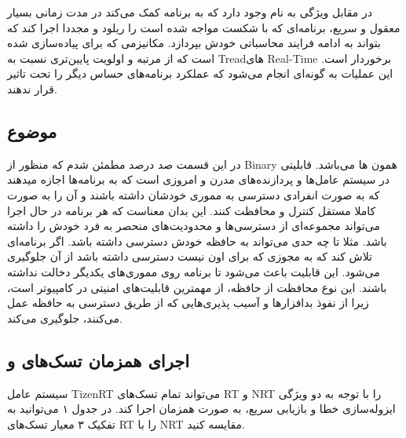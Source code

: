 \documentclass[10pt, a4paper]{article}
\begin{document}
در مقابل ویژگی به نام  وجود دارد که به برنامه کمک می‌کند در
مدت زمانی بسیار معقول و سریع، برنامه‌ای که با شکست مواجه شده‌ است را ریلود و
مجددا اجرا کند که بتواند به ادامه فرایند محاسباتی خودش بپردازد. مکانیزمی که برای
 پیاده‌سازی شده است که از مرتبه و اولویت پایین‌تری نسبت به
Treadهای Real-Time برخوردار است. این عملیات به گونه‌ای انجام می‌شود که عملکرد
برنامه‌های حساس دیگر  را تحت تاثیر قرار ندهند.

\subsection{موضوع }

در این قسمت صد درصد مطمئن شدم که منظور از Binary همون ها
می‌باشد. قابلیتی در سیستم عامل‌ها و پردازنده‌های مدرن و امروزی است که به
برنامه‌ها اجازه میدهند که به صورت انفرادی دسترسی به مموری خودشان داشته باشند و
آن را به صورت کاملا مستقل کنترل و محافظت کنند. این بدان معناست که هر برنامه در
حال اجرا می‌تواند مجموعه‌ای از دسترسی‌ها و محدودیت‌های منحصر به فرد خودش را
داشته باشد. مثلا تا چه حدی می‌تواند به حافظه خودش دسترسی داشته باشد. اگر
برنامه‌ای تلاش کند که به مجوزی که برای اون نیست دسترسی داشته باشد از آن جلوگیری
می‌شود. این قابلیت باعث می‌شود تا برنامه روی مموری‌های یکدیگر دخالت نداشته
باشند. این نوع محافظت از حافظه، از مهمترین قابلیت‌های امنیتی در کامپیوتر است،
زیرا از نفوذ بدافزار‌ها و آسیب پذیری‌هایی که از طریق دسترسی به حافظه عمل
می‌کنند، جلوگیری می‌کند.

\subsection{اجرای همزمان تسک‌های  و }

سیستم عامل TizenRT می‌تواند تمام تسک‌های RT و NRT را با توجه به دو ویژگی
ایزوله‌سازی خطا و بازیابی سریع، به صورت همزمان اجرا کند. در جدول ۱ می‌توانید به
تفکیک ۳ معیار تسک‌های RT را با NRT مقایسه کنید.

\begin{table}[h]
    \centering
    \begin{RTL}
      \caption{
      تسک‌ها}
    \end{RTL}
\end{table}
\end{document}
